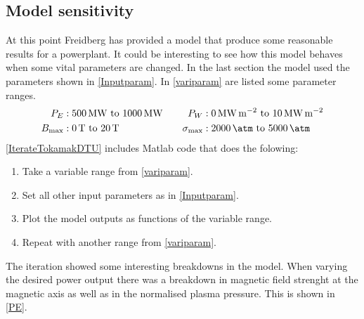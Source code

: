 \subsection{Model sensitivity}
At this point Freidberg has provided a model that produce some reasonable results for a powerplant. It could be interesting to see how this model behaves when some vital parameters are changed. In the last section the model used the parameters shown in \cref{Inputparam}. In \cref{variparam} are listed some parameter ranges.
\begin{alignat}{3}
	P_E &: \SIrange{500}{1000}{\mega\watt} & \quad P_W &: \SIrange{0}{10}{\mega\watt\per\meter\squared}\nonumber\\
	B_{\max} &: \SIrange{0}{20}{\tesla} & \quad \sigma_{\max} &: \SIrange{2000}{5000}{\atm}\label{variparam}
\end{alignat}
\cref{IterateTokamakDTU} includes Matlab code that does the folowing:
\begin{enumerate}
	\item Take a variable range from \cref{variparam}.
	\item Set all other input parameters as in \cref{Inputparam}.
	\item Plot the model outputs as functions of the variable range.
	\item Repeat with another range from \cref{variparam}.
\end{enumerate}
The iteration showed some interesting breakdowns in the model. When varying the desired power output there was a breakdown in magnetic field strenght at the magnetic axis as well as in the normalised plasma pressure. This is shown in \cref{PE}.
